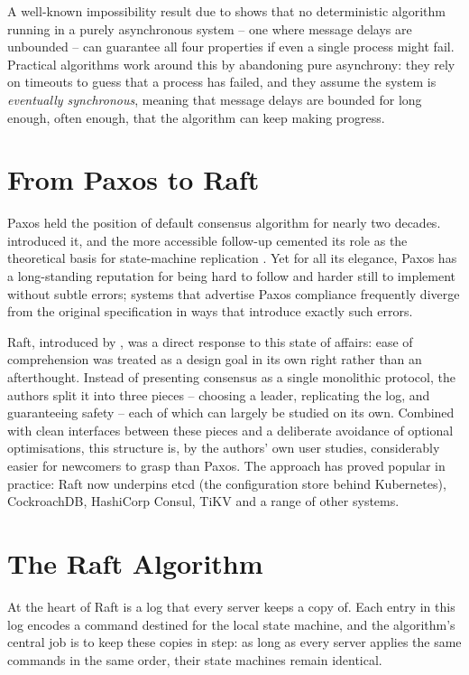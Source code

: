 A well-known impossibility result due to \citet{flp1985} shows that no deterministic algorithm running in a purely asynchronous system -- one where message delays are unbounded -- can guarantee all four properties if even a single process might fail. Practical algorithms work around this by abandoning pure asynchrony: they rely on timeouts to guess that a process has failed, and they assume the system is \emph{eventually synchronous}, meaning that message delays are bounded for long enough, often enough, that the algorithm can keep making progress.

\section{From Paxos to Raft}

Paxos held the position of default consensus algorithm for nearly two decades. \citet{lamport1998} introduced it, and the more accessible follow-up \citep{lamport2001} cemented its role as the theoretical basis for state-machine replication \citep{schneider1990}. Yet for all its elegance, Paxos has a long-standing reputation for being hard to follow and harder still to implement without subtle errors; systems that advertise Paxos compliance frequently diverge from the original specification in ways that introduce exactly such errors.

Raft, introduced by \citet{ongaro2014}, was a direct response to this state of affairs: ease of comprehension was treated as a design goal in its own right rather than an afterthought. Instead of presenting consensus as a single monolithic protocol, the authors split it into three pieces -- choosing a leader, replicating the log, and guaranteeing safety -- each of which can largely be studied on its own. Combined with clean interfaces between these pieces and a deliberate avoidance of optional optimisations, this structure is, by the authors' own user studies, considerably easier for newcomers to grasp than Paxos. The approach has proved popular in practice: Raft now underpins etcd \citep{etcd2024} (the configuration store behind Kubernetes), CockroachDB, HashiCorp Consul, TiKV and a range of other systems.

\section{The Raft Algorithm}

At the heart of Raft is a log that every server keeps a copy of. Each entry in this log encodes a command destined for the local state machine, and the algorithm's central job is to keep these copies in step: as long as every server applies the same commands in the same order, their state machines remain identical.

